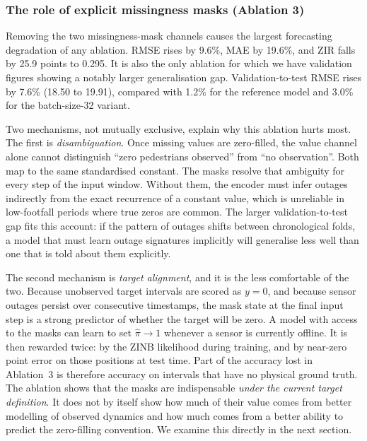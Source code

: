 \subsubsection{The role of explicit missingness masks (Ablation 3)}
\label{sec:exp3-abl-masks}

Removing the two missingness-mask channels causes the largest
forecasting degradation of any ablation. RMSE rises by 9.6\%, MAE by
19.6\%, and ZIR falls by 25.9 points to 0.295. It is also the
only ablation for which we have validation figures showing a notably
larger generalisation gap. Validation-to-test RMSE rises by 7.6\% (18.50
to 19.91), compared with 1.2\% for the reference model and 3.0\% for the
batch-size-32 variant.

Two mechanisms, not mutually exclusive, explain why this ablation hurts
most. The first is \emph{disambiguation}. Once missing values are
zero-filled, the value channel alone cannot distinguish ``zero
pedestrians observed'' from ``no observation''. Both map to the same
standardised constant. The masks resolve that ambiguity for every step
of the input window. Without them, the encoder must infer outages
indirectly from the exact recurrence of a constant value, which is
unreliable in low-footfall periods where true zeros are common. The
larger validation-to-test gap fits this account: if the pattern of
outages shifts between chronological folds, a model that must learn
outage signatures implicitly will generalise less well than one that is
told about them explicitly.

The second mechanism is \emph{target alignment}, and it is the less
comfortable of the two. Because unobserved target intervals are scored
as $y = 0$, and because sensor outages persist over consecutive
timestamps, the mask state at the final input step is a strong predictor
of whether the target will be zero. A model with access to the masks can
learn to set $\hat{\pi} \to 1$ whenever a sensor is currently offline. It
is then rewarded twice: by the ZINB likelihood during training, and by
near-zero point error on those positions at test time. Part of the
accuracy lost in Ablation~3 is therefore accuracy on intervals that have
no physical ground truth. The ablation shows that the masks are
indispensable \emph{under the current target definition}. It does not
by itself show how much of their value comes from better modelling of
observed dynamics and how much comes from a better ability to predict
the zero-filling convention. We examine this directly in the next
section.

